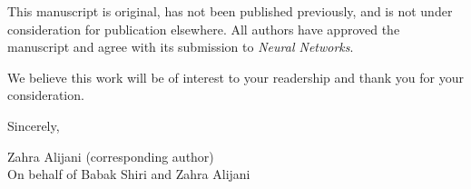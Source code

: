 \documentclass[11pt]{article}
\begin{document}
\vspace{1em}
\noindent This manuscript is original, has not been published previously, and is not under consideration for publication elsewhere. All authors have approved the manuscript and agree with its submission to \emph{Neural Networks}.


\vspace{1em}
\noindent We believe this work will be of interest to your readership and thank you for your consideration.

\vspace{2em}
\noindent Sincerely,

\vspace{2em}
\noindent Zahra Alijani (corresponding author)\\
On behalf of Babak Shiri and Zahra Alijani
\end{document}
